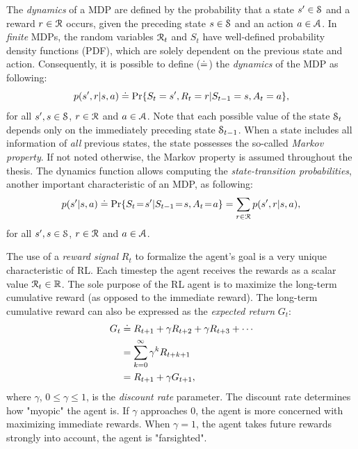 \documentclass[a4paper, twoside, 12pt]{article}
\begin{document}
The \emph{dynamics} of a MDP are defined by the probability that a state \(s'\in \S\)
and a reward \(r\in\R\) occurs, given the preceding state \(s\in\S\) and an action
\(a\in\A\). In \emph{finite} MDPs, the random variables \(\R_t\) and \(S_t\) have
well-defined probability density functions (PDF), which are solely dependent on
the previous state and action. Consequently, it is possible to define (\(\defeq\))
the \emph{dynamics} of the MDP as following:
\begin{equation}
    p(s',r|s,a) \defeq \Pr{S_t=s',R_t=r|S_{t-1}=s,A_t=a},
\end{equation}
for all \(s',s\in\S\), \(r\in\R\) and \(a\in\A\). Note that each possible value of
the state \(\S_t\) depends only on the immediately preceding state \(\S_{t-1}\).
When a state includes all information of \emph{all} previous states, the state
possesses the so-called \emph{Markov property}. If not noted otherwise, the Markov
property is assumed throughout the thesis.
The dynamics function allows computing the \emph{state-transition probabilities},
another important characteristic of an MDP, as following:
\begin{equation}
    p(s'|s,a) \defeq \Pr{S_t\!=\!s'|S_{t-1}\!=\!s,A_t\!=\!a} = \sum_{r\in\R}{p(s', r|s, a)},
\end{equation}
for all \(s',s\in\S\), \(r\in\R\) and \(a\in\A\).

The use of a \emph{reward signal} \(R_t\) to formalize the agent's goal is a very
unique characteristic of RL. Each timestep the agent receives the rewards as a scalar
value \(\R_t\in\Re\). The sole purpose of the RL agent is to maximize the
long-term cumulative reward (as opposed to the immediate reward). The long-term
cumulative reward can also be expressed as the \emph{expected return} \(G_t\):
\begin{equation} \label{eq-expected-return}
\begin{split}
    G_t &\defeq R_{t+1} + \gamma R_{t+2} + \gamma R_{t+3} + \cdots \\
    &= \sum_{k=0}^{\infty}{\gamma^k R_{t+k+1}} \\
    &= R_{t+1} + \gamma G_{t+1},
\end{split}
\end{equation}
where \(\gamma\), \(0\leq\gamma\leq 1\), is the \emph{discount rate} parameter. The
discount rate determines how "myopic" the agent is. If \(\gamma\) approaches 0,
the agent is more concerned with maximizing immediate rewards. When \(\gamma\!=\!
1\), the agent takes future rewards strongly into account, the agent is
"farsighted".
\end{document}
